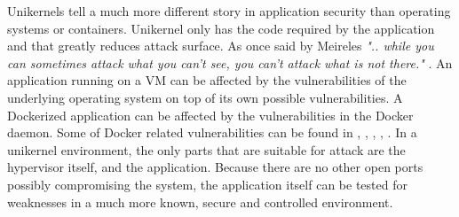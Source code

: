 Unikernels tell a much more different story in application security than operating systems or containers. Unikernel only has the code required by the application and that greatly reduces attack surface. As once said by Meireles  \textit{".. while you can sometimes attack what you can't see, you can't attack what is not there."} \cite{mailing-list}. An application running on a VM can be affected by the vulnerabilities of the underlying operating system on top of its own possible vulnerabilities. A Dockerized application can be affected by the vulnerabilities in the Docker daemon. Some of Docker related vulnerabilities can be found in \cite{CVE-2019-14271-details}, \cite{CVE-2018-9862-details}, \cite{CVE-2018-8115-details}, \cite{CVE-2018-11757-details}, \cite{CVE-2019-5736-details}. In a unikernel environment, the only parts that are suitable for attack are the hypervisor itself, and the application. Because there are no other open ports possibly compromising the system, the application itself can be tested for weaknesses in a much more known, secure and controlled environment.

